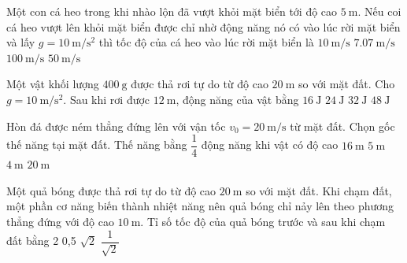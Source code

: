 \begin{ex}
	Một con cá heo trong khi nhào lộn đã vượt khỏi mặt biển tới độ cao $\SI{5}{\meter}$. Nếu coi cá heo vượt lên khỏi mặt biển được chỉ nhờ động năng nó có vào lúc rời mặt biển và lấy $g=\SI{10}{\meter/\second^2}$ thì tốc độ của cá heo vào lúc rời mặt biển là
	\choice
	{\True $\SI{10}{\meter/\second}$}
	{$\SI{7.07}{\meter/\second}$}
	{$\SI{100}{\meter/\second}$}
	{$\SI{50}{\meter/\second}$}
\end{ex}
\begin{ex}
	Một vật khối lượng $\SI{400}{\gram}$ được thả rơi tự do từ độ cao $\SI{20}{\meter}$ so với mặt đất. Cho $g=\SI{10}{\meter/\second^2}$. Sau khi rơi được $\SI{12}{\meter}$, động năng của vật bằng
	\choice
	{$\SI{16}{\joule}$}
	{$\SI{24}{\joule}$}
	{$\SI{32}{\joule}$}
	{\True $\SI{48}{\joule}$}
\end{ex}
\begin{ex}
	Hòn đá được ném thẳng đứng lên với vận tốc $v_0=\SI{20}{\meter/\second}$ từ mặt đất. Chọn gốc thế năng tại mặt đất. Thế năng bằng $\dfrac{1}{4}$ động năng khi vật có độ cao
	\choice
	{$\SI{16}{\meter}$}
	{$\SI{5}{\meter}$}
	{\True $\SI{4}{\meter}$}
	{$\SI{20}{\meter}$}
\end{ex}
\begin{ex}
	Một quả bóng được thả rơi tự do từ độ cao $\SI{20}{\meter}$ so với mặt đất. Khi chạm đất, một phần cơ năng biến thành nhiệt năng nên quả bóng chỉ nảy lên theo phương thẳng đứng với độ cao $\SI{10}{\meter}$. Tỉ số tốc độ của quả bóng trước và sau khi chạm đất bằng
	\choice
	{2}
	{0,5}
	{\True $\sqrt{2}$}
	{$\dfrac{1}{\sqrt{2}}$}
\end{ex}
